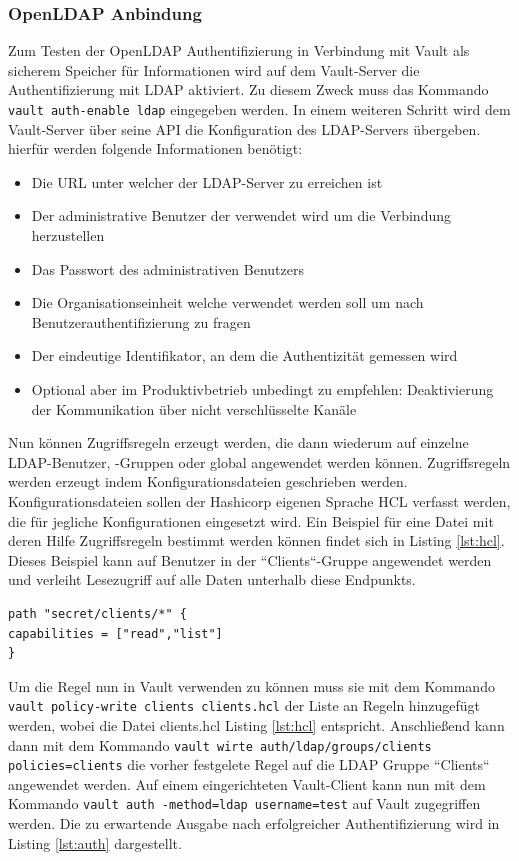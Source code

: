 \documentclass[
book,
a4paper,   
titlepage,  
halfparskip,
12pt        
]{scrartcl}
\newcommand\inline{\lstinline[basicstyle=\ttfamily]}
\begin{document}
\begin{onehalfspacing}
\subsubsection{OpenLDAP Anbindung}
Zum Testen der OpenLDAP Authentifizierung in Verbindung mit Vault als sicherem Speicher für Informationen wird auf dem Vault-Server die Authentifizierung mit \ac{LDAP} aktiviert. Zu diesem Zweck muss das Kommando \inline|vault auth-enable ldap| eingegeben werden. In einem weiteren Schritt wird dem Vault-Server über seine \ac{API} die Konfiguration des LDAP-Servers übergeben. hierfür werden folgende Informationen benötigt\cite{vaultapi}:
\begin{itemize}
	\item Die \ac{URL} unter welcher der LDAP-Server zu erreichen ist
	\item Der administrative Benutzer der verwendet wird um die Verbindung herzustellen
	\item Das Passwort des administrativen Benutzers
	\item Die Organisationseinheit welche verwendet werden soll um nach Benutzerauthentifizierung zu fragen
	\item Der eindeutige Identifikator, an dem die Authentizität gemessen wird
	\item Optional aber im Produktivbetrieb unbedingt zu empfehlen: Deaktivierung der Kommunikation über nicht verschlüsselte Kanäle 
\end{itemize} 
Nun können Zugriffsregeln erzeugt werden, die dann wiederum auf einzelne \ac{LDAP}-Benutzer, -Gruppen oder global angewendet werden können. Zugriffsregeln werden erzeugt indem Konfigurationsdateien geschrieben werden. Konfigurationsdateien sollen der Hashicorp eigenen Sprache \ac{HCL} verfasst werden, die für jegliche Konfigurationen eingesetzt wird. Ein Beispiel für eine Datei mit deren Hilfe Zugriffsregeln bestimmt werden können findet sich in Listing \vref{lst:hcl}. Dieses Beispiel kann auf Benutzer in der ``Clients``-Gruppe angewendet werden und verleiht Lesezugriff auf alle Daten unterhalb diese Endpunkts.\cite{vaultldap}

\begin{lstlisting}[caption={[Beispiel \acs{HCL}] Beispiel für eine Konfigurationsdatei im \ac{HCL}-Format\cite{vaultpol}}, label=lst:hcl, captionpos=b, basicstyle=\ttfamily] 
path "secret/clients/*" {
capabilities = ["read","list"]
}
\end{lstlisting}

Um die Regel nun in Vault verwenden zu können muss sie mit dem Kommando \inline|vault policy-write clients clients.hcl| der Liste an Regeln hinzugefügt werden, wobei die Datei clients.hcl Listing \vref{lst:hcl} entspricht. Anschließend kann dann  mit dem Kommando \inline|vault wirte auth/ldap/groups/clients policies=clients| die vorher festgelete Regel auf die \ac{LDAP} Gruppe ``Clients`` angewendet werden.\newline
Auf einem eingerichteten Vault-Client kann nun mit dem Kommando \inline|vault auth -method=ldap username=test| auf Vault zugegriffen werden. Die zu erwartende Ausgabe nach erfolgreicher Authentifizierung wird in Listing \vref{lst:auth} dargestellt.\cite{vaultldap}


\end{onehalfspacing}
\end{document}
